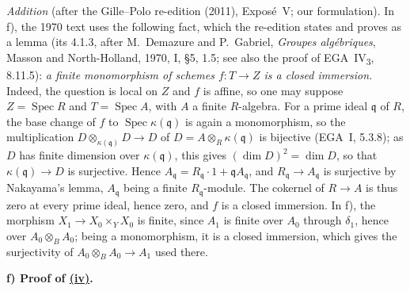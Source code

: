\par\medskip\noindent
\emph{Addition} (after the Gille--Polo re-edition (2011), Exposé~V; our
formulation). In f), the 1970 text uses the following fact, which the
re-edition states and proves as a lemma (its 4.1.3, after M.~Demazure and
P.~Gabriel, \emph{Groupes algébriques}, Masson and North-Holland, 1970,
I, \S5, 1.5; see also the proof of EGA~IV\textsubscript{3}, 8.11.5): \emph{a finite
monomorphism of schemes \(f\colon T\to Z\) is a closed immersion.} Indeed, the
question is local on \(Z\) and \(f\) is affine, so one may suppose
\(Z=\operatorname{Spec}R\) and \(T=\operatorname{Spec}A\), with \(A\) a finite
\(R\)-algebra. For a prime ideal \(\mathfrak q\) of \(R\), the base change of \(f\)
to \(\operatorname{Spec}\kappa(\mathfrak q)\) is again a monomorphism, so the
multiplication \(D\otimes_{\kappa(\mathfrak q)}D\to D\) of
\(D=A\otimes_R\kappa(\mathfrak q)\) is bijective (EGA~I, 5.3.8); as \(D\) has
finite dimension over \(\kappa(\mathfrak q)\), this gives
\((\dim D)^2=\dim D\), so that \(\kappa(\mathfrak q)\to D\) is surjective. Hence
\(A_{\mathfrak q}=R_{\mathfrak q}\cdot1+\mathfrak qA_{\mathfrak q}\), and
\(R_{\mathfrak q}\to A_{\mathfrak q}\) is surjective by Nakayama's lemma,
\(A_{\mathfrak q}\) being a finite \(R_{\mathfrak q}\)-module. The cokernel of
\(R\to A\) is thus zero at every prime ideal, hence zero, and \(f\) is a
closed immersion. In f), the morphism \(X_1\to X_0\times_YX_0\) is finite,
since \(A_1\) is finite over \(A_0\) through \(\delta_1\), hence over
\(A_0\otimes_BA_0\); being a monomorphism, it is a closed immersion, which
gives the surjectivity of \(A_0\otimes_BA_0\to A_1\) used there.
\par\medskip

\medskip
{}\label{proof:sga3-V-4.1-f}%
\noindent\textbf{f) Proof of \hyperref[thm:sga3-V-4.1-iv]{(iv)}.}
